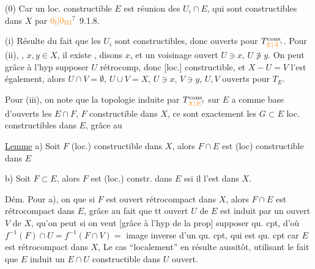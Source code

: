 (0) Car  un loc. constructible $E$ est réunion des $U_i\cap E$, qui sont constructibles dans $X$ par $\unsure{0_{\mathrm I}|0_{\mathrm{III}}}$ 9.1.8.

(i) Résulte du fait que les $U_i$ sont \inserted{[loc.]} constructibles, donc ouverts pour $T_{\unsure{E|X}}^{\mathrm{cons}}$. Pour (ii), , $x,y\in X$, il existe , disons $x$, et un voisinage ouvert $U\ni x$, $U\not\ni y$. On peut grâce à l'hyp supposer $U$ rétrocomp, donc [loc.] constructible, et $X-U=V$ l'est  également, alors $U\cap V=\emptyset$, $U\cup V=X$, $U\ni x$, $V\ni y$, $U,V$ ouverts pour $T_E$.

Pour (iii), on note que la topologie induite par $T_{\unsure{X|E}}^{\mathrm{cons}}$ sur $E$ a comme base d'ouverts les $E\cap F$, $F$   constructible dans $X$, ce sont exactement les $G\subset E$ loc. constructibles dans $E$,
grâce au

\uline{Lemme} \quad a) Soit  $F$ (loc.) constructible dans $X$,  alors $F\cap E$ est (loc) constructible dans $E$

b) Soit  $F\subset E$,  alors $F$ est (loc.) constr. dans $E$ ssi il l'est dans $X$.

Dém. Pour a), on  que si $F$ est ouvert rétrocompact dans $X$, alors $F\cap E$ est rétrocompact dans $E$, grâce au fait que tt ouvert  $U$ de $E$ est
induit par un ouvert $V$ de $X$, qu'on peut si on veut [grâce à l'hyp  de la prop] supposer qu. cpt, d'où $f^{-1}(F)\cap U=f^{-1}(F\cap V)=$ image inverse d'un qu. cpt, qui est qu. cpt car $E$ est rétrocompact dans $X$,   Le cas ``localement''
en résulte aussitôt, utilisant le fait que $E$ induit un $E\cap U$ constructible dans  $U$ ouvert.

